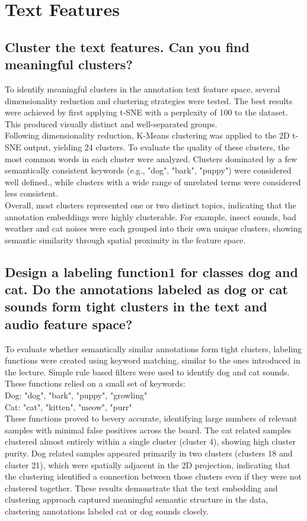 
\section{Text Features}
\label{sec:Text Features}


\subsection{Cluster the text features. Can you find meaningful clusters?}
\label{sec:Text Features:a}
To identify meaningful clusters in the annotation text feature space, several dimensionality reduction and clustering strategies were tested. The best results were achieved by first applying t-SNE with a perplexity of 100 to the dataset. This produced visually distinct and well-separated groups. \\
Following dimensionality reduction, K-Means clustering was applied to the 2D t-SNE output, yielding 24 clusters. To evaluate the quality of these clusters, the most common words in each cluster were analyzed. Clusters dominated by a few semantically consistent keywords (e.g., "dog", "bark", "puppy") were considered well defined., while clusters with a wide range of unrelated terms were considered less consistent. \\
Overall, most clusters represented one or two distinct topics, indicating that the annotation embeddings were highly clusterable. For example, insect sounds, bad weather and cat noises were each grouped into their own unique clusters, showing semantic similarity through spatial proximity in the feature space.


\subsection{Design a labeling function1 for classes dog and cat. Do the annotations labeled as dog or cat sounds
form tight clusters in the text and audio feature space?}
\label{sec:Text Features:b}

To evaluate whether semantically similar annotations form tight clusters, labeling functions were created using keyword matching, similar to the ones introduced in the lecture. Simple rule based filters were used to identify dog and cat sounds. These functions relied on a small set of keywords:\\
Dog: "dog", "bark", "puppy", "growling"\\
Cat: "cat", "kitten", "meow", "purr"\\
These functions proved to bevery accurate, identifying large numbers of relevant samples with minimal false positives across the board. The cat related samples clustered almost entirely within a single cluster (cluster 4), showing high cluster purity. Dog related samples appeared primarily in two clusters (clusters 18 and cluster 21), which were spatially adjacent in the 2D projection, indicating that the clustering identified a connection between those clusters even if they were not clustered together.
These results demonstrate that the text embedding and clustering approach captured meaningful semantic structure in the data, clustering annotations labeled cat or dog sounds closely.


